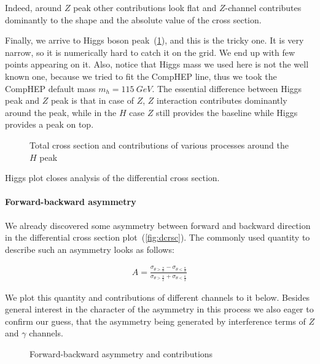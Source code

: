 \documentclass{article}
\newcommand{\scatteringoutput}{../scattering/output}
\begin{document}
Indeed, around $Z$ peak other contributions look flat and $Z$-channel contributes dominantly to the shape and the absolute value of the cross section.

Finally, we arrive to Higgs boson peak~(\cref{fig:totcrsc_Hpeak}), and this is the tricky one. It is very narrow, so it is numerically hard to catch it on the grid. We end up with few points appearing on it. Also, notice that Higgs mass we used here is not the well known one, because we tried to fit the CompHEP line, thus we took the CompHEP default mass $m_h = 115~GeV$. The essential difference between Higgs peak and $Z$ peak is that in case of $Z$, $Z$ interaction contributes dominantly around the peak, while in the $H$ case $Z$ still provides the baseline while Higgs provides a peak on top.

\begin{figure}[H]
    \centering
    \hfill%
    \caption{Total cross section and contributions of various processes around the $H$ peak}%
    \label{fig:totcrsc_Hpeak}
\end{figure}

Higgs plot closes analysis of the differential cross section.

\paragraph{Forward-backward asymmetry} We already discovered some asymmetry between forward and backward direction in the differential cross section plot~(\cref{fig:dcrsc}). The commonly used quantity to describe such an asymmetry looks as follows:

\begin{align}
    A = \frac{\sigma_{\theta > \frac{\pi}{2}} - \sigma_{\theta < \frac{\pi}{2}}}{\sigma_{\theta > \frac{\pi}{2}} + \sigma_{\theta < \frac{\pi}{2}}}
\end{align}

We plot this quantity and contributions of different channels to it below. Besides general interest in the character of the asymmetry in this process we also eager to confirm our guess, that the asymmetry being generated by interference terms of $Z$ and $\gamma$ channels.

\begin{figure}[H]
    \centering
    \hfill%
    \caption{Forward-backward asymmetry and contributions}%
    \label{fig:fbasym}
\end{figure}
\end{document}
